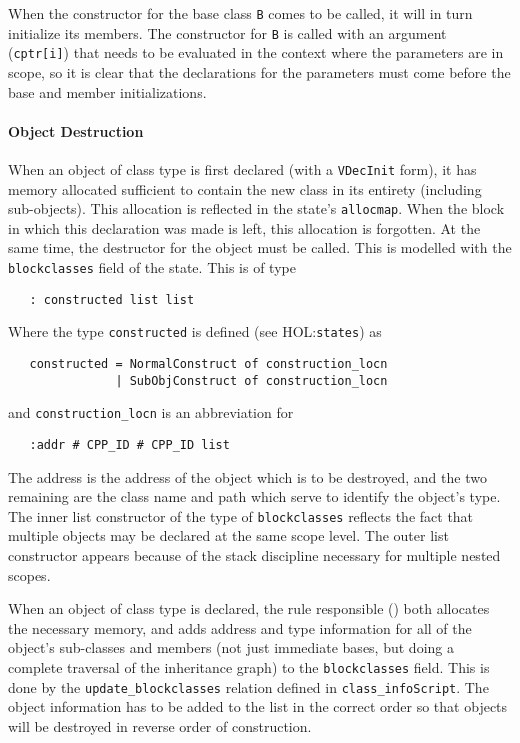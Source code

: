 \documentclass[11pt]{article}
\newcommand{\HOLfile}[1]{HOL:\texttt{#1}}
\begin{document}
When the constructor for the base class \texttt{B} comes to be called,
it will in turn initialize its members.  The constructor for
\texttt{B} is called with an argument (\texttt{cptr[i]}) that needs to
be evaluated in the context where the parameters are in scope, so it
is clear that the declarations for the parameters must come before the
base and member initializations.

\paragraph{Object Destruction}
When an object of class type is first declared (with a
\texttt{VDecInit} form), it has memory allocated sufficient to contain
the new class in its entirety (including sub-objects).  This
allocation is reflected in the state's \texttt{allocmap}.  When the
block in which this declaration was made is left, this allocation is
forgotten.  At the same time, the destructor for the object must be
called.  This is modelled with the
\texttt{blockclasses} field of the state.%
%
This is of type
\begin{verbatim}
   : constructed list list
\end{verbatim}
Where the type \texttt{constructed} is defined (see \HOLfile{states})
as
\begin{verbatim}
   constructed = NormalConstruct of construction_locn
               | SubObjConstruct of construction_locn
\end{verbatim}
and \texttt{construction_locn} is an abbreviation for
\begin{verbatim}
   :addr # CPP_ID # CPP_ID list
\end{verbatim}
The address is the address of the object which is to be destroyed, and
the two remaining are the class name and path which serve to identify
the object's type.  The inner list constructor of the type of
\texttt{blockclasses} reflects the fact that multiple objects may be
declared at the same scope level.  The outer list constructor appears
because of the stack discipline necessary for multiple nested scopes.

When an object of class type is declared, the rule responsible
() both allocates
the necessary memory, and adds address and type information for all of
the object's sub-classes and members (not just immediate bases, but
doing a complete traversal of the inheritance graph) to the
\texttt{blockclasses} field.  This is done by the
\texttt{update_blockclasses} relation defined in
\texttt{class_infoScript}.  The object information has to be added
to the list in the correct order so that objects will be destroyed in
reverse order of construction.
\end{document}
